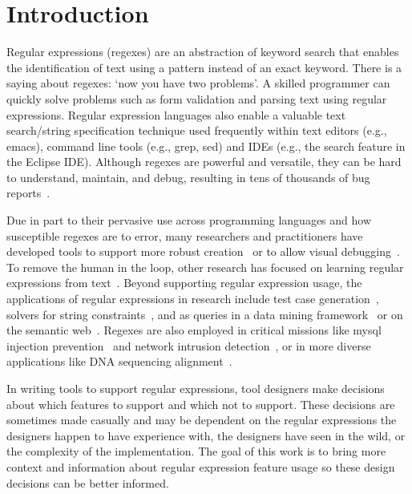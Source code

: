 \section{Introduction }

Regular expressions (regexes) are an abstraction of keyword search that enables the identification of text using a pattern instead of an exact keyword.
There is a saying about regexes: `now you have two problems'.
A skilled programmer can quickly solve problems such as form validation and parsing text using regular expressions.  Regular expression languages also enable a valuable text search/string specification technique used frequently within text editors (e.g., emacs), command line tools (e.g., grep, sed) and IDEs (e.g., the search feature in the Eclipse IDE).  Although regexes are powerful and versatile, they can be hard to understand,  maintain, and debug, resulting in tens of thousands of bug reports~\cite{Spishak:2012:TSR:2318202.2318207}.

Due in part to their pervasive use across programming languages and how susceptible regexes are to error, many researchers and practitioners have developed tools to support more robust creation~\cite{Spishak:2012:TSR:2318202.2318207} or to allow visual debugging~\cite{Beck:2014:RVD:2591062.2591111}. To remove the human in the loop, other research has focused on learning regular expressions from  text~\cite{Babbar:2010:CBA:1871840.1871848, Li:2008:REL:1613715.1613719}.
Beyond supporting regular expression usage, the applications of regular expressions in research include test case generation~\cite{Ghosh:2013:JAT:2486788.2486925, Galler:2014:STD:2683035.2683100, Anand:2013:OSM:2503903.2503991, Tillmann:2014:TAT:2642937.2642941},
solvers for string constraints~\cite{Trinh:2014:SSS:2660267.2660372, hampi}, and as queries in a data mining framework~\cite{Begel:2010:CDE:1806799.1806821} or on the semantic web~\cite{Lee:2010:PSQ:1871871.1871877}.
Regexes are also employed in critical missions like mysql injection prevention~\cite{Yeole:2011:ADT:1980022.1980229} and network intrusion detection~\cite{network}, or in more diverse applications like DNA sequencing alignment~\cite{1594922}.


In writing tools to support regular expressions, tool designers make decisions about which features to support and which not to support. These decisions are sometimes made casually and may be dependent on the regular expressions the designers happen to have experience with, the designers have seen in the wild, or the complexity of the implementation. The goal of this work is to bring more context and information about regular expression feature usage so these design decisions can be better informed.

